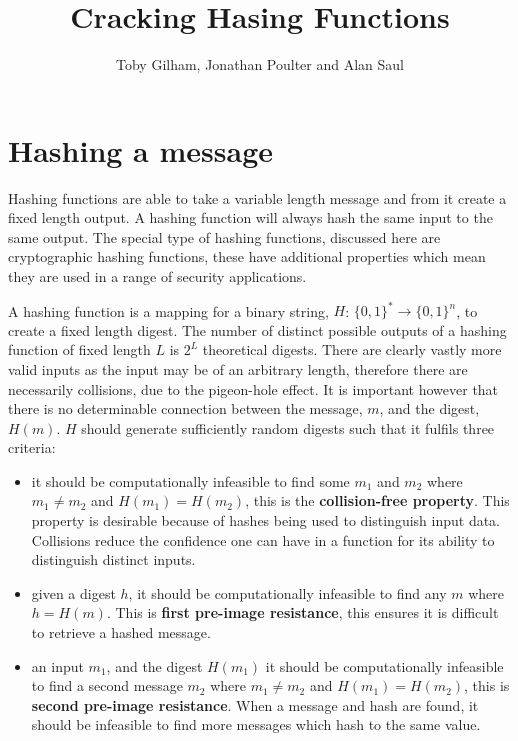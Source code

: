 \documentclass[a4paper,12pt]{article}
\title{Cracking Hasing Functions}
\author{Toby Gilham, Jonathan Poulter and Alan Saul}
\date{}
\begin{document}
\maketitle



\section{Hashing a message}
\label{sec:propeties_of_a_hash}
Hashing functions are able to take a variable length message and from it create a fixed length output. A hashing function will always hash the same input to the same output. The special type of hashing functions, discussed here are cryptographic hashing functions, these have additional properties which mean they are used in a range of security applications.

A hashing function is a mapping for a binary string, $H$: $\{0,1\}^* \rightarrow \{0,1\}^n$, to create a fixed length digest. The number of distinct possible outputs of a hashing function of fixed length $L$ is $2^L$ theoretical digests. There are clearly vastly more valid inputs as the input may be of an arbitrary length, therefore there are necessarily collisions, due to the pigeon-hole effect. It is important however that there is no determinable connection between the message, $m$, and the digest, $H(m)$. $H$ should generate sufficiently random digests such that it fulfils three criteria:
\begin{itemize}
  \item it should be computationally infeasible to find some $m_1$ and $m_2$ where $m_1 \neq m_2$ and $H(m_1) = H(m_2)$, this is the \textbf{collision-free property}. This property is desirable because of hashes being used to distinguish input data. Collisions reduce the confidence one can have in a function for its ability to distinguish distinct inputs.
  \item given a digest $h$, it should be computationally infeasible to find any $m$ where $h = H(m)$. This is \textbf{first pre-image resistance}, this ensures it is difficult to retrieve a hashed message.
  \item  an input $m_1$, and the digest $H(m_1)$ it should be computationally infeasible to find a second message $m_2$ where $m_1 \neq m_2$ and $H(m_1) = H(m_2)$, this is \textbf{second pre-image resistance}. When a message and hash are found, it should be infeasible to find more messages which hash to the same value.
\end{itemize}
\end{document}
